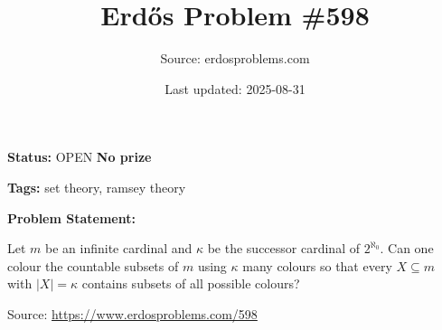 \documentclass{article}
\title{Erd\H{o}s Problem \#598}
\date{Last updated: 2025-08-31}
\author{Source: erdosproblems.com}
\begin{document}
\maketitle

\noindent\textbf{Status:} OPEN \quad \textbf{No prize}

\noindent\textbf{Tags:} set theory, ramsey theory

\medskip

\noindent\textbf{Problem Statement:}

Let $m$ be an infinite cardinal and $\kappa$ be the successor cardinal of $2^{\aleph_0}$. Can one colour the countable subsets of $m$ using $\kappa$ many colours so that every $X\subseteq m$ with $\lvert X\rvert=\kappa$ contains subsets of all possible colours?


\bigskip
\noindent\small{Source: \url{https://www.erdosproblems.com/598}}
\end{document}
